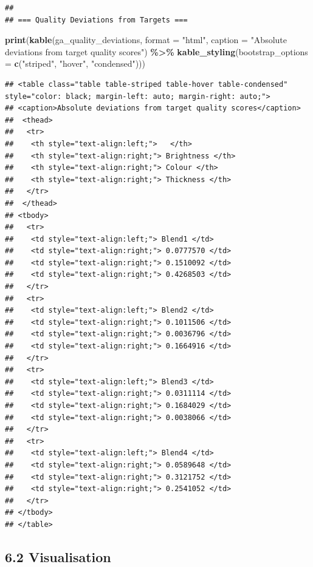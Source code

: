 \documentclass[
]{article}
\newenvironment{Shaded}{\begin{snugshade}}{\end{snugshade}}
\newcommand{\AttributeTok}[1]{\textcolor[rgb]{0.13,0.29,0.53}{#1}}
\newcommand{\FunctionTok}[1]{\textcolor[rgb]{0.13,0.29,0.53}{\textbf{#1}}}
\newcommand{\NormalTok}[1]{#1}
\newcommand{\SpecialCharTok}[1]{\textcolor[rgb]{0.81,0.36,0.00}{\textbf{#1}}}
\newcommand{\StringTok}[1]{\textcolor[rgb]{0.31,0.60,0.02}{#1}}
\begin{document}
\begin{verbatim}
## 
## === Quality Deviations from Targets ===
\end{verbatim}

\begin{Shaded}
\begin{Highlighting}[]
\FunctionTok{print}\NormalTok{(}\FunctionTok{kable}\NormalTok{(ga\_quality\_deviations, }\AttributeTok{format =} \StringTok{"html"}\NormalTok{, }
            \AttributeTok{caption =} \StringTok{"Absolute deviations from target quality scores"}\NormalTok{) }\SpecialCharTok{\%\textgreater{}\%}
      \FunctionTok{kable\_styling}\NormalTok{(}\AttributeTok{bootstrap\_options =} \FunctionTok{c}\NormalTok{(}\StringTok{"striped"}\NormalTok{, }\StringTok{"hover"}\NormalTok{, }\StringTok{"condensed"}\NormalTok{)))}
\end{Highlighting}
\end{Shaded}

\begin{verbatim}
## <table class="table table-striped table-hover table-condensed" style="color: black; margin-left: auto; margin-right: auto;">
## <caption>Absolute deviations from target quality scores</caption>
##  <thead>
##   <tr>
##    <th style="text-align:left;">   </th>
##    <th style="text-align:right;"> Brightness </th>
##    <th style="text-align:right;"> Colour </th>
##    <th style="text-align:right;"> Thickness </th>
##   </tr>
##  </thead>
## <tbody>
##   <tr>
##    <td style="text-align:left;"> Blend1 </td>
##    <td style="text-align:right;"> 0.0777570 </td>
##    <td style="text-align:right;"> 0.1510092 </td>
##    <td style="text-align:right;"> 0.4268503 </td>
##   </tr>
##   <tr>
##    <td style="text-align:left;"> Blend2 </td>
##    <td style="text-align:right;"> 0.1011506 </td>
##    <td style="text-align:right;"> 0.0036796 </td>
##    <td style="text-align:right;"> 0.1664916 </td>
##   </tr>
##   <tr>
##    <td style="text-align:left;"> Blend3 </td>
##    <td style="text-align:right;"> 0.0311114 </td>
##    <td style="text-align:right;"> 0.1684029 </td>
##    <td style="text-align:right;"> 0.0038066 </td>
##   </tr>
##   <tr>
##    <td style="text-align:left;"> Blend4 </td>
##    <td style="text-align:right;"> 0.0589648 </td>
##    <td style="text-align:right;"> 0.3121752 </td>
##    <td style="text-align:right;"> 0.2541052 </td>
##   </tr>
## </tbody>
## </table>
\end{verbatim}

\subsection{6.2 Visualisation}\label{visualisation-3}
\end{document}
